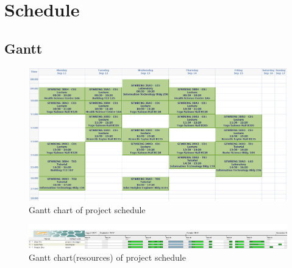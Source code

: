 \documentclass[12,english]{article}
\begin{document}
\clearpage

\section{Schedule}

\subsection{Gantt}
    \begin{figure}[h]
    \centering
	\includegraphics[width=1.1\textwidth]{gantt.png}
    \caption{Gantt chart of project schedule}
	\end{figure}

	\begin{figure}[h]
	\centering
	\includegraphics[width=1\textwidth]{resource.png}
	\caption{Gantt chart(resources) of project schedule}
	\end{figure}
	
\end{document}
